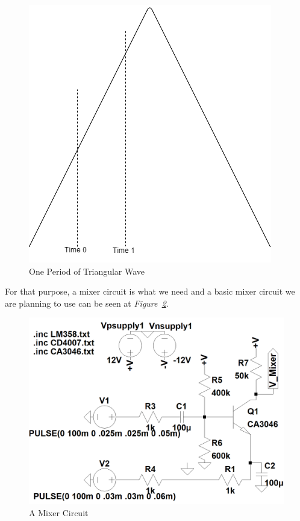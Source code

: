 \documentclass[paper]{IEEEtran}
\begin{document}
\begin{figure}[h!]
\setlength{\unitlength}{\textwidth}
\center 
\includegraphics[width=0.25\unitlength]{triangular.png}
\caption{\label{fig:trimix}One Period of Triangular Wave }
\end{figure}	

	
	For that purpose, a mixer circuit is what we need and a basic mixer circuit we are planning to use can be seen at \textit{Figure~\ref{fig:mixer}}.
	
\begin{figure}[h!]
\setlength{\unitlength}{\textwidth}
\center 
\includegraphics[width=0.45\unitlength]{mixerv2.png}
\caption{\label{fig:mixer}A Mixer Circuit }
\end{figure}	
\end{document}
